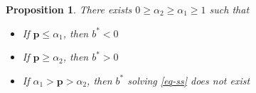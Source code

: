 \documentclass[12pt]{article}
\newcommand{\dge}[1]{\textcolor{blue}{$^{\textrm{dge}}${#1}}}
\newtheorem{proposition}[theorem]{Proposition}
\begin{document}
\begin{proposition}\label{prop:ssexistence}
There exists $0 \geq \alpha_2\geq\alpha_1\geq1$
such that
  \begin{itemize}
   \item[a.] If $\bm{p}\leq \alpha_1$, then $b^* < 0$ %
   \item[b.] If $\bm{p} \geq \alpha_2$, then $b^* > 0$ %
   \item[c.] If $\alpha_1>\bm{p}>\alpha_2$, then $b^*$ solving \eqref{eq-ss}  does not exist
  \end{itemize}

\end{proposition}
\end{document}
